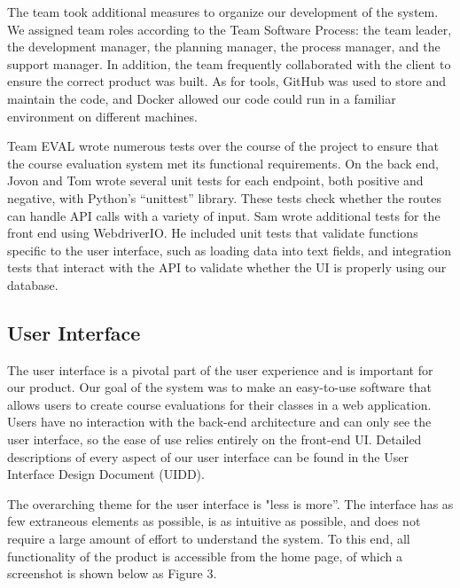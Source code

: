 \documentclass{article}
\begin{document}
The team took additional measures to organize our development of the system. We assigned team roles according to the Team Software Process: the team leader, the development manager, the planning manager, the process manager, and the support manager. In addition, the team frequently collaborated with the client to ensure the correct product was built. As for tools, GitHub was used to store and maintain the code, and Docker allowed our code could run in a familiar environment on different machines.

Team EVAL wrote numerous tests over the course of the project to ensure that the course evaluation system met its functional requirements. On the back end, Jovon and Tom wrote several unit tests for each endpoint, both positive and negative, with Python's ``unittest'' library. These tests check whether the routes can handle API calls with a variety of input. Sam wrote additional tests for the front end using WebdriverIO. He included unit tests that validate functions specific to the user interface, such as loading data into text fields, and integration tests that interact with the API to validate whether the UI is properly using our database.

\subsection{User Interface}

The user interface is a pivotal part of the user experience and is important for our product. Our goal of the system was to make an easy-to-use software that allows users to create course evaluations for their classes in a web application. Users have no interaction with the back-end architecture and can only see the user interface, so the ease of use relies entirely on the front-end UI. Detailed descriptions of every aspect of our user interface can be found in the User Interface Design Document (UIDD).

\newpage

The overarching theme for the user interface is "less is more''.  The interface has as few extraneous elements as possible, is as intuitive as possible, and does not require a large amount of effort to understand the system. To this end, all functionality of the product is accessible from the home page, of which a screenshot is shown below as Figure 3.
\end{document}

